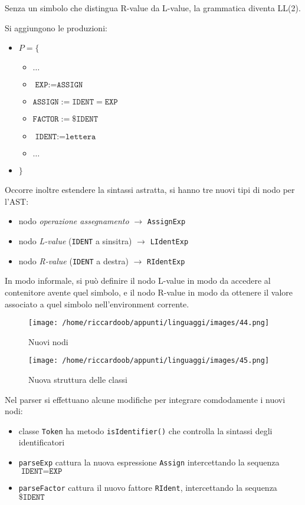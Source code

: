 Senza un simbolo che distingua R-value da L-value, la grammatica diventa LL(2).

Si aggiungono le produzioni:
\begin{itemize}[label={}]
    \item $P = \{$
    \begin{itemize}[label={}]
        \item $\dots$
        \item $\texttt{EXP} := \texttt{ASSIGN}$
        \item $\texttt{ASSIGN} := \texttt{IDENT} = \texttt{EXP}$
        \item $\texttt{FACTOR} := \$\texttt{IDENT}$
        \item $\texttt{IDENT} := \texttt{lettera}$
        \item $\dots$
    \end{itemize}
    \item $\}$
\end{itemize}
\setlist{}

Occorre inoltre estendere la sintassi astratta, si hanno tre nuovi tipi di nodo per l'AST:
\begin{itemize}
    \item nodo \textit{operazione assegnamento} $\rightarrow$ \texttt{AssignExp}
    \item nodo \textit{L-value} (\texttt{IDENT} a sinsitra) $\rightarrow$ \texttt{LIdentExp}
    \item nodo \textit{R-value} (\texttt{IDENT} a destra) $\rightarrow$ \texttt{RIdentExp}
\end{itemize}

In modo informale, si può definire il nodo L-value in modo da accedere al contenitore avente quel simbolo, e il nodo R-value in modo da ottenere il valore associato a quel simbolo nell'environment corrente.

\begin{figure}[H]
    \caption{Nuovi nodi}
    \centering
    \texttt{[image: /home/riccardoob/appunti/linguaggi/images/44.png]}
\end{figure}

\begin{figure}[H]
    \caption{Nuova struttura delle classi}
    \centering
    \texttt{[image: /home/riccardoob/appunti/linguaggi/images/45.png]}
\end{figure}

Nel parser si effettuano alcune modifiche per integrare comdodamente i nuovi nodi:
\begin{itemize}
    \item classe \texttt{Token} ha metodo \texttt{isIdentifier()} che controlla la sintassi degli identificatori
    \item \texttt{parseExp} cattura la nuova espressione \texttt{Assign} intercettando la sequenza $\texttt{IDENT} = \texttt{EXP}$
    \item \texttt{parseFactor} cattura il nuovo fattore \texttt{RIdent}, intercettando la sequenza $\$\texttt{IDENT}$
\end{itemize}


